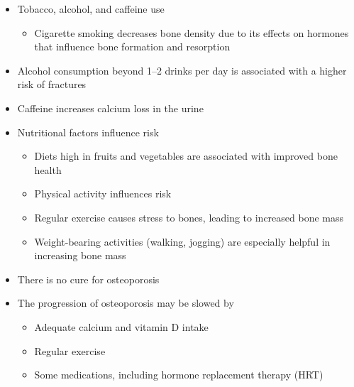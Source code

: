\documentclass[title={Chapter 9}]{fdsn201notes}
\begin{document}
\begin{itemize}
	\item Tobacco, alcohol, and caffeine use
	\begin{itemize}
		\item Cigarette smoking decreases bone density due to its effects on hormones that influence bone formation and resorption
	\end{itemize}
	\item Alcohol consumption beyond 1--2 drinks per day is associated with a higher risk of fractures
	\item Caffeine increases calcium loss in the urine
	\item Nutritional factors influence risk
	\begin{itemize}
		\item Diets high in fruits and vegetables are associated with improved bone health
	\end{itemize}
	\begin{itemize}
		\item Physical activity influences risk
	\end{itemize}
	\begin{itemize}
		\item Regular exercise causes stress to bones, leading to increased bone mass
		\item Weight-bearing activities (walking, jogging) are especially helpful in increasing bone mass
	\end{itemize}
	\item There is no cure for osteoporosis
	\item The progression of osteoporosis may be slowed by
	\begin{itemize}
		\item Adequate calcium and vitamin D intake
		\item Regular exercise
		\item Some medications, including hormone replacement therapy (HRT)
	\end{itemize}
\end{itemize}
\end{document}
